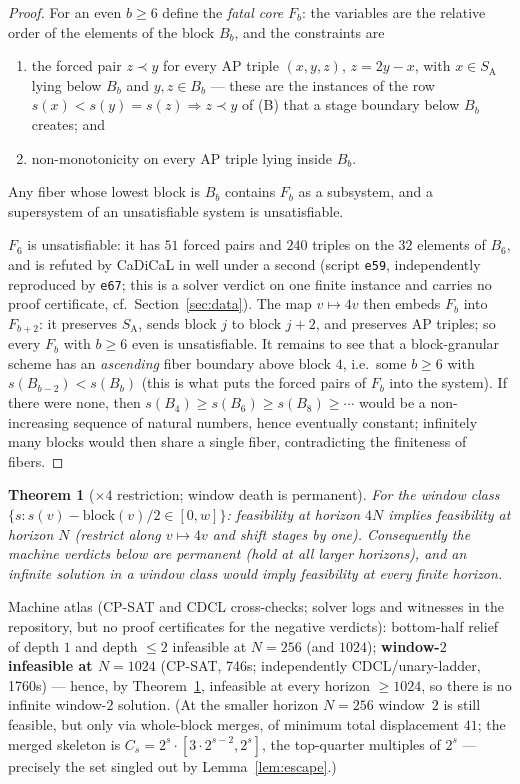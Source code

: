 \documentclass[11pt]{article}
\newtheorem{theorem}{Theorem}
\theoremstyle{definition}
\newcommand{\SA}{S_{\mathrm{A}}}
\begin{document}
\begin{proof}
For an even $b \ge 6$ define the \emph{fatal core} $F_b$: the variables are
the relative order of the elements of the block $B_b$, and the constraints
are
\begin{enumerate}
\item[(a)] the forced pair $z \prec y$ for every AP triple $(x, y, z)$,
$z = 2y - x$, with $x \in \SA$ lying below $B_b$ and $y, z \in B_b$ --- these are the
instances of the row $s(x) < s(y) = s(z) \Rightarrow z \prec y$ of (B) that
a stage boundary below $B_b$ creates; and
\item[(b)] non-monotonicity on every AP triple lying inside $B_b$.
\end{enumerate}
Any fiber whose lowest block is $B_b$ contains $F_b$ as a subsystem, and a
supersystem of an unsatisfiable system is unsatisfiable.

$F_6$ is unsatisfiable: it has $51$ forced pairs and $240$ triples on the
$32$ elements of $B_6$, and is refuted by CaDiCaL in well under a second
(script \texttt{e59}, independently reproduced by \texttt{e67}; this is a
solver verdict on one finite instance and carries no proof certificate, cf.\
Section~\ref{sec:data}). The map $v \mapsto 4v$ then embeds $F_b$ into
$F_{b+2}$: it
preserves $\SA$, sends block $j$ to block $j{+}2$, and preserves AP triples;
so every $F_b$ with $b \ge 6$ even is unsatisfiable.
It remains to see that a block-granular scheme
has an \emph{ascending} fiber boundary above block $4$, i.e.\ some
$b \ge 6$ with $s(B_{b-2}) < s(B_b)$ (this is what puts the forced pairs of
$F_b$ into the system). If there were none, then
$s(B_4) \ge s(B_6) \ge s(B_8) \ge \cdots$ would be a non-increasing
sequence of natural numbers, hence eventually constant; infinitely many
blocks would then share a single fiber, contradicting the finiteness of
fibers.
\end{proof}

\begin{theorem}[$\times 4$ restriction; window death is permanent]
\label{thm:restriction}
For the window class $\{s : s(v)-\mathrm{block}(v)/2 \in [0,w]\}$:
feasibility at horizon $4N$ implies feasibility at horizon $N$ (restrict
along $v \mapsto 4v$ and shift stages by one). Consequently the machine
verdicts below are permanent (hold at all larger horizons), and an infinite
solution in a window class would imply feasibility at every finite horizon.
\end{theorem}

\noindent Machine atlas (CP-SAT and CDCL cross-checks; solver logs and
witnesses in the repository, but no proof certificates for the negative
verdicts): bottom-half relief of depth $1$ and depth $\le 2$ infeasible at
$N=256$ (and $1024$); \textbf{window-$2$ infeasible at $N=1024$} (CP-SAT, 746s; independently CDCL/unary-ladder, 1760s) --- hence, by
Theorem~\ref{thm:restriction}, infeasible at every horizon
$\ge 1024$, so there is no infinite window-$2$ solution. (At the smaller
horizon $N=256$ window~$2$ is still feasible, but only via whole-block
merges, of minimum total displacement $41$; the merged skeleton is
$C_s = 2^{s}\cdot[3\cdot 2^{s-2}, 2^{s}]$, the top-quarter multiples of
$2^{s}$ --- precisely the set singled out by Lemma~\ref{lem:escape}.)
\end{document}
